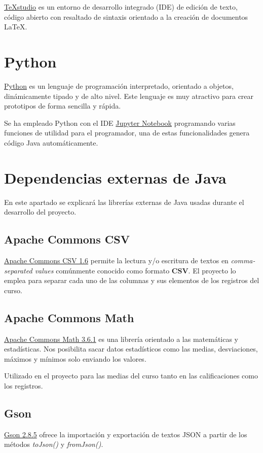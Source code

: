 \href{https://www.texstudio.org/}{TeXstudio} es un entorno de desarrollo integrado (IDE) de edición de texto, código abierto con resaltado de sintaxis orientado a la creación de documentos \LaTeX.

\section{Python}
\href{https://www.python.org/}{Python} es un lenguaje de programación interpretado, orientado a objetos, dinámicamente tipado y de alto nivel. Este lenguaje es muy atractivo para crear prototipos de forma sencilla y rápida. 

Se ha empleado Python con el IDE \href{https://jupyter.org/}{Jupyter Notebook} programando varias funciones de utilidad para el programador, una de estas funcionalidades genera código Java automáticamente.

\section{Dependencias externas de Java}
En este apartado se explicará las librerías externas de Java usadas durante el desarrollo del proyecto. 

\subsection{Apache Commons CSV}
\href{https://commons.apache.org/proper/commons-csv/
}{Apache Commons CSV 1.6} permite la lectura y/o escritura de textos en \textit{comma-separated values} comúnmente conocido como formato \textbf{CSV}. 
El proyecto lo emplea para separar cada uno de las columnas y sus elementos de los registros del curso.

\subsection{Apache Commons Math}
\href{https://commons.apache.org/proper/commons-math/}{Apache Commons Math
3.6.1} es una librería orientado a las matemáticas y estadísticas.
Nos posibilita sacar datos estadísticos como las medias, desviaciones, máximos y mínimos solo enviando los valores.

Utilizado en el proyecto para las medias del curso tanto en las calificaciones como los registros.

\subsection{Gson}
\href{https://github.com/google/gson}{Gson 2.8.5} ofrece la importación y exportación de textos JSON a partir de los métodos \textit{toJson()} y \textit{fromJson()}.

